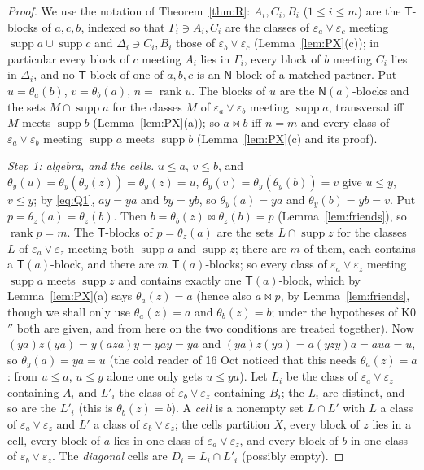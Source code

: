 \documentclass[11pt]{amsart}
\theoremstyle{definition}
\newcommand{\supp}{\operatorname{supp}}
\newcommand{\T}{\mathsf{T}}
\newcommand{\N}{\mathsf{N}}
\newcommand{\rk}{\operatorname{rank}}
\newcommand{\mt}{\bowtie}   %
\begin{document}
\begin{proof}
We use the notation of Theorem~\ref{thm:R}: $A_i,C_i,B_i$ ($1\le i\le m$) are the $\T$-blocks of $a,c,b$, indexed so that $\Gamma_i\ni A_i,C_i$ are the classes of $\varepsilon_a\vee\varepsilon_c$ meeting $\supp a\cup\supp c$ and $\Delta_i\ni C_i,B_i$ those of $\varepsilon_b\vee\varepsilon_c$ (Lemma~\ref{lem:PX}(c)); in particular every block of $c$ meeting $A_i$ lies in $\Gamma_i$, every block of $b$ meeting $C_i$ lies in $\Delta_i$, and no $\T$-block of one of $a,b,c$ is an $\N$-block of a matched partner. Put $u=\theta_a(b)$, $v=\theta_b(a)$, $n=\rk u$. The blocks of $u$ are the $\N(a)$-blocks and the sets $M\cap\supp a$ for the classes $M$ of $\varepsilon_a\vee\varepsilon_b$ meeting $\supp a$, transversal iff $M$ meets $\supp b$ (Lemma~\ref{lem:PX}(a)); so $a\mt b$ iff $n=m$ and every class of $\varepsilon_a\vee\varepsilon_b$ meeting $\supp a$ meets $\supp b$ (Lemma~\ref{lem:PX}(c) and its proof).

\smallskip\emph{Step 1: algebra, and the cells.} $u\le a$, $v\le b$, and $\theta_y(u)=\theta_y(\theta_y(z))=\theta_y(z)=u$, $\theta_y(v)=\theta_y(\theta_y(b))=v$ give $u\le y$, $v\le y$; by \eqref{eq:Q1}, $ay=ya$ and $by=yb$, so $\theta_y(a)=ya$ and $\theta_y(b)=yb=v$. Put $p=\theta_z(a)=\theta_z(b)$. Then $b=\theta_b(z)\mt\theta_z(b)=p$ (Lemma~\ref{lem:friends}), so $\rk p=m$. The $\T$-blocks of $p=\theta_z(a)$ are the sets $L\cap\supp z$ for the classes $L$ of $\varepsilon_a\vee\varepsilon_z$ meeting both $\supp a$ and $\supp z$; there are $m$ of them, each contains a $\T(a)$-block, and there are $m$ $\T(a)$-blocks; so every class of $\varepsilon_a\vee\varepsilon_z$ meeting $\supp a$ meets $\supp z$ and contains exactly one $\T(a)$-block, which by Lemma~\ref{lem:PX}(a) says $\theta_a(z)=a$ (hence also $a\mt p$, by Lemma~\ref{lem:friends}, though we shall only use $\theta_a(z)=a$ and $\theta_b(z)=b$; under the hypotheses of K0$''$ both are given, and from here on the two conditions are treated together). Now $(ya)z(ya)=y(aza)y=yay=ya$ and $(ya)z(ya)=a(yzy)a=aua=u$, so $\theta_y(a)=ya=u$ (the cold reader of 16 Oct noticed that this needs $\theta_a(z)=a$: from $u\le a$, $u\le y$ alone one only gets $u\le ya$). Let $L_i$ be the class of $\varepsilon_a\vee\varepsilon_z$ containing $A_i$ and $L'_i$ the class of $\varepsilon_b\vee\varepsilon_z$ containing $B_i$; the $L_i$ are distinct, and so are the $L'_i$ (this is $\theta_b(z)=b$). A \emph{cell} is a nonempty set $L\cap L'$ with $L$ a class of $\varepsilon_a\vee\varepsilon_z$ and $L'$ a class of $\varepsilon_b\vee\varepsilon_z$; the cells partition $X$, every block of $z$ lies in a cell, every block of $a$ lies in one class of $\varepsilon_a\vee\varepsilon_z$, and every block of $b$ in one class of $\varepsilon_b\vee\varepsilon_z$. The \emph{diagonal} cells are $D_i=L_i\cap L'_i$ (possibly empty).


\end{proof}
\end{document}
